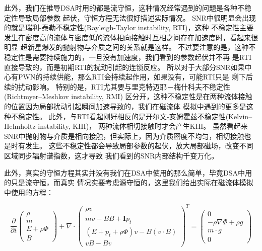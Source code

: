 此外，我们在推导DSA时用的都是流守恒，这种情况经常遇到的问题是各种不稳定性导致局部参数
起伏，守恒方程无法很好描述实际情况。
SNR中很明显会出现的就是瑞利-泰勒不稳定性(Rayleigh-Taylor instability, RTI)，这种
不稳定性主要发生在密度高的流体与密度低的流体相向接触时互相之间存在加速度时，看起来很明显
超新星爆发的抛射物与介质之间的关系就是这样。
不过要注意的是，这种不稳定性是需要持续施力的，一旦没有加速度，我们看到的参数起伏并不再
是RTI直接导致的，而是初期RTI的扰动引起的连锁反应。
所以对于大部分SNR如果中心有PWN的持续供能，那么RTI会持续起作用，如果没有，可能RTI只是
剩下后续的扰动影响。
特别的是，RTI尤其要与里克特迈耶－梅什科夫不稳定性(Richtmyer–Meshkov instability, RMI)
区分开，这种不稳定性是在两种流体接触的位置因为局部扰动引起瞬间加速导致的，我们在磁流体
模拟中遇到的更多是这种不稳定性。
此外，与RTI看起刚好相反的是开尔文-亥姆霍兹不稳定性(Kelvin–Helmholtz instability, KHI)，
两种流体相切接触时才会产生KHI。
虽然看起来SNR中抛射物与介质是相向接触，但实际上，因为介质密度不均匀，相切接触也是时有发生。
这些不稳定性都会导致局部参数的起伏，放大局部磁场，改变不同区域同步辐射谱指数，这才导致
我们看到的SNR内部结构千变万化。

此外，真实的守恒方程其实并没有我们在DSA中使用的那么简单，毕竟DSA中用的只是流守恒，而真实
情况实要考虑源守恒的，这里我们给出实际在磁流体模拟中使用的方程：

\begin{equation}
\frac{\partial}{\partial t} \left( \begin{array}{c}{\rho} \\ {m} \\ {E+\rho \Phi}
\\ {B}\end{array}\right)+\nabla \cdot \left( \begin{array}{c}{\rho v} \\
{m v-B B+\mathbf{I} p_{t}} \\ {\left(E+p_{t}+\rho \Phi\right) v-B(v \cdot B)}
\\ {v B-B v}\end{array}\right)^{T}=\left( \begin{array}{c}{0} \\
{-\rho \nabla \Phi+\rho g} \\ {m \cdot g} \\ {0}\end{array}\right)
\end{equation}

